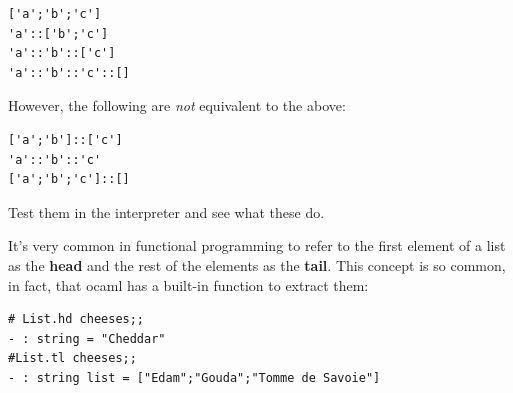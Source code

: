 \documentclass[10pt]{book}
\begin{document}

\beforeverb
\begin{verbatim}
['a';'b';'c']
'a'::['b';'c']
'a'::'b'::['c']
'a'::'b'::'c'::[]
\end{verbatim}
\afterverb
However, the following are {\it not} equivalent to the above:
\beforeverb
\begin{verbatim}
['a';'b']::['c']
'a'::'b'::'c'
['a';'b';'c']::[]
\end{verbatim}
\afterverb
Test them in the interpreter and see what these do.

It's very common in functional programming to refer to the first element 
of a list as the {\bf head} and the rest of the elements as the {\bf tail}. This
concept is so common, in fact, that ocaml has a built-in function to extract them:

\beforeverb
\begin{verbatim}
# List.hd cheeses;;
- : string = "Cheddar"
#List.tl cheeses;;
- : string list = ["Edam";"Gouda";"Tomme de Savoie"]
\end{verbatim}
\afterverb

\end{document}
